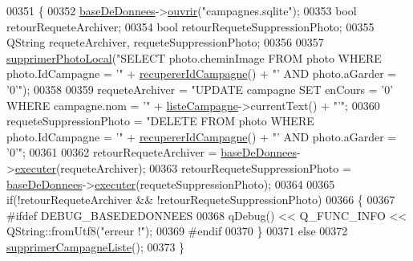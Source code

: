 \begin{DoxyCode}
00351 \{
00352     \hyperlink{class_i_h_m_accueil_ab56d9846c071396a92f88272880e2c1f}{baseDeDonnees}->\hyperlink{class_base_de_donnees_a7f6a5510b08017b0d99115a84252f186}{ouvrir}(\textcolor{stringliteral}{"campagnes.sqlite"});
00353     \textcolor{keywordtype}{bool} retourRequeteArchiver;
00354     \textcolor{keywordtype}{bool} retourRequeteSuppressionPhoto;
00355     QString requeteArchiver, requeteSuppressionPhoto;
00356 
00357     \hyperlink{class_i_h_m_accueil_a9dc22241cd0d4a227b8b0bf04c6404fd}{supprimerPhotoLocal}(\textcolor{stringliteral}{"SELECT photo.cheminImage FROM photo WHERE photo.IdCampagne = '"}
       + \hyperlink{class_i_h_m_accueil_a5e222617897b2c1f7e032fa851aa1700}{recupererIdCampagne}() + \textcolor{stringliteral}{"' AND photo.aGarder = '0'"});
00358 
00359     requeteArchiver = \textcolor{stringliteral}{"UPDATE campagne SET enCours = '0' WHERE campagne.nom = '"} + 
      \hyperlink{class_i_h_m_accueil_afb828a4e06c25afa40341c310cd85b08}{listeCampagne}->currentText() + \textcolor{stringliteral}{"'"};
00360     requeteSuppressionPhoto = \textcolor{stringliteral}{"DELETE FROM photo WHERE photo.IdCampagne = '"} + 
      \hyperlink{class_i_h_m_accueil_a5e222617897b2c1f7e032fa851aa1700}{recupererIdCampagne}() + \textcolor{stringliteral}{"' AND photo.aGarder = '0'"};
00361 
00362     retourRequeteArchiver = \hyperlink{class_i_h_m_accueil_ab56d9846c071396a92f88272880e2c1f}{baseDeDonnees}->\hyperlink{class_base_de_donnees_aa8de5f8f8bb17edc43f5c0ee33712081}{executer}(requeteArchiver);
00363     retourRequeteSuppressionPhoto = \hyperlink{class_i_h_m_accueil_ab56d9846c071396a92f88272880e2c1f}{baseDeDonnees}->\hyperlink{class_base_de_donnees_aa8de5f8f8bb17edc43f5c0ee33712081}{executer}(requeteSuppressionPhoto);
00364 
00365     \textcolor{keywordflow}{if}(!retourRequeteArchiver && !retourRequeteSuppressionPhoto)
00366     \{
00367 \textcolor{preprocessor}{        #ifdef DEBUG\_BASEDEDONNEES}
00368             qDebug() << Q\_FUNC\_INFO << QString::fromUtf8(\textcolor{stringliteral}{"erreur !"});
00369 \textcolor{preprocessor}{        #endif}
00370     \}
00371     \textcolor{keywordflow}{else}
00372         \hyperlink{class_i_h_m_accueil_a36ce6ecca4e258562577bab1439e0a96}{supprimerCampagneListe}();
00373 \}
\end{DoxyCode}
\mbox{\label{class_i_h_m_accueil_a1ed3efefdf929c0d2a6b6d1bb10bbc27}} 
